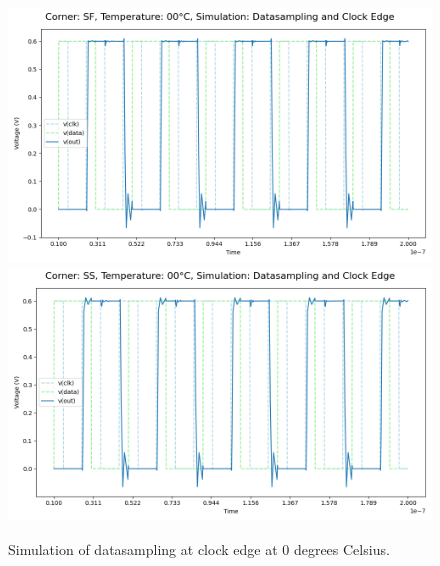 \begin{figure}[H]
    \vspace{5pt}
    \includegraphics[height= 0.21\textheight]{figures/aimspice/SF00W1.png}
    \vspace{5pt}
    \includegraphics[height= 0.21\textheight]{figures/aimspice/SS00W1.png}
    \caption{Simulation of datasampling at clock edge at 0 degrees Celsius.}
    \label{fig:aimspice_W1_0}
\end{figure}

\pagebreak

